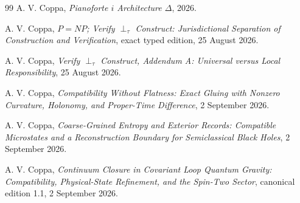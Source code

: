 \documentclass[11pt]{article}
\begin{document}
\begin{thebibliography}{99}
A. V. Coppa, \emph{Pianoforte $i$ Architecture $\Delta$}, 2026.

A. V. Coppa, \emph{$P=NP$; Verify $\perp_\tau$ Construct: Jurisdictional Separation of Construction and Verification}, exact typed edition, 25 August 2026.

A. V. Coppa, \emph{Verify $\perp_\tau$ Construct, Addendum A: Universal versus Local Responsibility}, 25 August 2026.

A. V. Coppa, \emph{Compatibility Without Flatness: Exact Gluing with Nonzero Curvature, Holonomy, and Proper-Time Difference}, 2 September 2026.

A. V. Coppa, \emph{Coarse-Grained Entropy and Exterior Records: Compatible Microstates and a Reconstruction Boundary for Semiclassical Black Holes}, 2 September 2026.

A. V. Coppa, \emph{Continuum Closure in Covariant Loop Quantum Gravity: Compatibility, Physical-State Refinement, and the Spin-Two Sector}, canonical edition 1.1, 2 September 2026.

\end{thebibliography}
\end{document}
